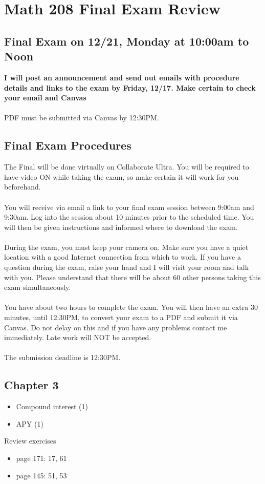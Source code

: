\documentclass[14pt]{extarticle}
\begin{document}
\section*{Math 208 Final Exam Review}


\subsection*{Final Exam on 12/21, Monday at 10:00am to Noon}
\textbf{I will post an announcement and send out emails with procedure details and links  to the exam by Friday, 12/17. Make certain to check your email and Canvas}
\\\\
PDF must be submitted via Canvas by 12:30PM.

\subsection{Final Exam Procedures}
The Final will be done virtually on Collaborate Ultra. You will be required to have video ON while taking the exam, so make certain it will work for you beforehand.
\\\\
You will receive via email a link to your final exam session between 9:00am and 9:30am. Log into the session about 10 minutes prior to the scheduled time. You will then be given instructions and informed where to download the exam.
\\\\
During the exam, you must keep your camera on. Make sure you have a quiet location with a good Internet connection from which to work. If you have a question during the exam, raise your hand and I will visit your room and talk with you. Please understand that there will be about 60 other persons taking this exam simultaneously.
\\\\
You have about two hours to complete the exam. You will then have an extra 30 minutes, until 12:30PM, to convert your exam to a PDF and submit it via Canvas. Do not delay on this and if you have any problems contact me immediately. Late work will NOT be accepted.
\\\\
The submission deadline is 12:30PM.

\subsection{Chapter 3}
\begin{itemize}
	\item Compound interest (1)
	\item APY (1)
\end{itemize}
Review exercises 
\begin{itemize}
	\item page 171: 17, 61
	\item page 145: 51, 53
\end{itemize}
\end{document}
